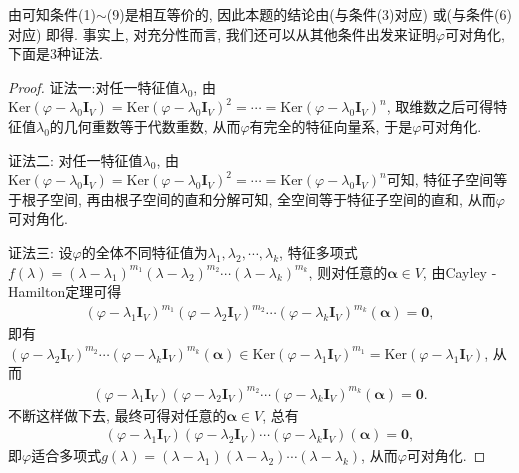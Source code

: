 \documentclass[../../main.tex]{subfiles}
\begin{document}
\begin{note}
由可知条件(1)$\sim$(9)是相互等价的, 因此本题的结论由(与条件(3)对应) 或(与条件(6)对应) 即得. 事实上, 对充分性而言, 我们还可以从其他条件出发来证明\(\varphi\)可对角化, 下面是\(3\)种证法.
\end{note}
\begin{proof}
{\color{blue}证法一:}对任一特征值\(\lambda_{0}\), 由\(\mathrm{Ker}(\varphi-\lambda_{0}\boldsymbol{I}_{V})=\mathrm{Ker}(\varphi-\lambda_{0}\boldsymbol{I}_{V})^{2}=\cdots=\mathrm{Ker}(\varphi-\lambda_{0}\boldsymbol{I}_{V})^{n}\), 取维数之后可得特征值\(\lambda_{0}\)的几何重数等于代数重数, 从而\(\varphi\)有完全的特征向量系, 于是\(\varphi\)可对角化.
    
{\color{blue}证法二:} 对任一特征值\(\lambda_{0}\), 由\(\mathrm{Ker}(\varphi-\lambda_{0}\boldsymbol{I}_{V})=\mathrm{Ker}(\varphi-\lambda_{0}\boldsymbol{I}_{V})^{2}=\cdots=\mathrm{Ker}(\varphi-\lambda_{0}\boldsymbol{I}_{V})^{n}\)可知, 特征子空间等于根子空间, 再由根子空间的直和分解可知, 全空间等于特征子空间的直和, 从而\(\varphi\)可对角化.

{\color{blue}证法三:} 设\(\varphi\)的全体不同特征值为\(\lambda_{1},\lambda_{2},\cdots,\lambda_{k}\), 特征多项式\(f(\lambda)=(\lambda-\lambda_{1})^{m_{1}}(\lambda-\lambda_{2})^{m_{2}}\cdots(\lambda-\lambda_{k})^{m_{k}}\), 则对任意的\(\boldsymbol{\alpha}\in V\), 由Cayley - Hamilton定理可得
\begin{align*}
(\varphi-\lambda_{1}\boldsymbol{I}_{V})^{m_{1}}(\varphi-\lambda_{2}\boldsymbol{I}_{V})^{m_{2}}\cdots(\varphi-\lambda_{k}\boldsymbol{I}_{V})^{m_{k}}(\boldsymbol{\alpha}) = \boldsymbol{0},
\end{align*}
即有\((\varphi-\lambda_{2}\boldsymbol{I}_{V})^{m_{2}}\cdots(\varphi-\lambda_{k}\boldsymbol{I}_{V})^{m_{k}}(\boldsymbol{\alpha})\in\mathrm{Ker}(\varphi-\lambda_{1}\boldsymbol{I}_{V})^{m_{1}}=\mathrm{Ker}(\varphi-\lambda_{1}\boldsymbol{I}_{V})\), 从而
\begin{align*}
(\varphi-\lambda_{1}\boldsymbol{I}_{V})(\varphi-\lambda_{2}\boldsymbol{I}_{V})^{m_{2}}\cdots(\varphi-\lambda_{k}\boldsymbol{I}_{V})^{m_{k}}(\boldsymbol{\alpha}) = \boldsymbol{0}.
\end{align*}
不断这样做下去, 最终可得对任意的\(\boldsymbol{\alpha}\in V\), 总有
\begin{align*}
(\varphi-\lambda_{1}\boldsymbol{I}_{V})(\varphi-\lambda_{2}\boldsymbol{I}_{V})\cdots(\varphi-\lambda_{k}\boldsymbol{I}_{V})(\boldsymbol{\alpha}) = \boldsymbol{0},
\end{align*}
即\(\varphi\)适合多项式\(g(\lambda)=(\lambda-\lambda_{1})(\lambda-\lambda_{2})\cdots(\lambda-\lambda_{k})\), 从而\(\varphi\)可对角化. 
\end{proof}
\end{document}
